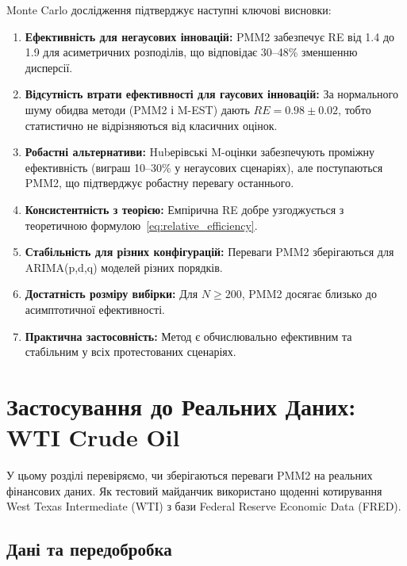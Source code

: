 \documentclass[12pt,a4paper]{article}
\begin{document}
Monte Carlo дослідження підтверджує наступні ключові висновки:

\begin{enumerate}
    \item \textbf{Ефективність для негаусових інновацій:} PMM2 забезпечує RE від 1.4 до 1.9 для асиметричних розподілів, що відповідає 30--48\% зменшенню дисперсії.

\item \textbf{Відсутність втрати ефективності для гаусових інновацій:} За нормального шуму обидва методи (PMM2 і M-EST) дають $RE = 0.98 \pm 0.02$, тобто статистично не відрізняються від класичних оцінок.
\item \textbf{Робастні альтернативи:} Hubерівські M-оцінки забезпечують проміжну ефективність (виграш 10--30\% у негаусових сценаріях), але поступаються PMM2, що підтверджує робастну перевагу останнього.

    \item \textbf{Консистентність з теорією:} Емпірична RE добре узгоджується з теоретичною формулою~\eqref{eq:relative_efficiency}.

    \item \textbf{Стабільність для різних конфігурацій:} Переваги PMM2 зберігаються для ARIMA(p,d,q) моделей різних порядків.

    \item \textbf{Достатність розміру вибірки:} Для $N \geq 200$, PMM2 досягає близько до асимптотичної ефективності.

    \item \textbf{Практична застосовність:} Метод є обчислювально ефективним та стабільним у всіх протестованих сценаріях.
\end{enumerate}

\section{Застосування до Реальних Даних: WTI Crude Oil}
\label{sec:wti_application}

У цьому розділі перевіряємо, чи зберігаються переваги PMM2 на реальних фінансових даних. Як тестовий майданчик використано щоденні котирування West Texas Intermediate (WTI) з бази Federal Reserve Economic Data (FRED).

\subsection{Дані та передобробка}
\label{subsec:wti_data_description}
\end{document}
